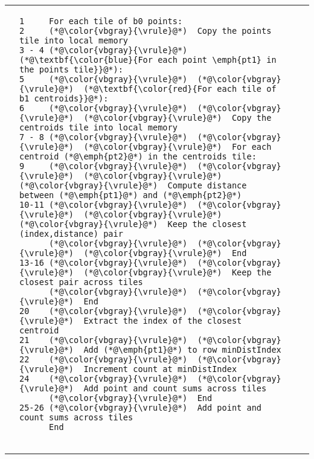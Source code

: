 \centering\begin{tabular}{cm{}m{}m{}}
{} &
{\begin{lstlisting}[numbers=none,language=Pseudo]
1     For each tile of b0 points:
2     (*@\color{vbgray}{\vrule}@*)  Copy the points tile into local memory
3 - 4 (*@\color{vbgray}{\vrule}@*)  (*@\textbf{\color{blue}{For each point \emph{pt1} in the points tile}}@*):
5     (*@\color{vbgray}{\vrule}@*)  (*@\color{vbgray}{\vrule}@*)  (*@\textbf{\color{red}{For each tile of b1 centroids}}@*):
6     (*@\color{vbgray}{\vrule}@*)  (*@\color{vbgray}{\vrule}@*)  (*@\color{vbgray}{\vrule}@*)  Copy the centroids tile into local memory
7 - 8 (*@\color{vbgray}{\vrule}@*)  (*@\color{vbgray}{\vrule}@*)  (*@\color{vbgray}{\vrule}@*)  For each centroid (*@\emph{pt2}@*) in the centroids tile:
9     (*@\color{vbgray}{\vrule}@*)  (*@\color{vbgray}{\vrule}@*)  (*@\color{vbgray}{\vrule}@*)  (*@\color{vbgray}{\vrule}@*)  Compute distance between (*@\emph{pt1}@*) and (*@\emph{pt2}@*)
10-11 (*@\color{vbgray}{\vrule}@*)  (*@\color{vbgray}{\vrule}@*)  (*@\color{vbgray}{\vrule}@*)  (*@\color{vbgray}{\vrule}@*)  Keep the closest (index,distance) pair
      (*@\color{vbgray}{\vrule}@*)  (*@\color{vbgray}{\vrule}@*)  (*@\color{vbgray}{\vrule}@*)  End
13-16 (*@\color{vbgray}{\vrule}@*)  (*@\color{vbgray}{\vrule}@*)  (*@\color{vbgray}{\vrule}@*)  Keep the closest pair across tiles
      (*@\color{vbgray}{\vrule}@*)  (*@\color{vbgray}{\vrule}@*)  End
20    (*@\color{vbgray}{\vrule}@*)  (*@\color{vbgray}{\vrule}@*)  Extract the index of the closest centroid
21    (*@\color{vbgray}{\vrule}@*)  (*@\color{vbgray}{\vrule}@*)  Add (*@\emph{pt1}@*) to row minDistIndex
22    (*@\color{vbgray}{\vrule}@*)  (*@\color{vbgray}{\vrule}@*)  Increment count at minDistIndex
24    (*@\color{vbgray}{\vrule}@*)  (*@\color{vbgray}{\vrule}@*)  Add point and count sums across tiles
      (*@\color{vbgray}{\vrule}@*)  End
25-26 (*@\color{vbgray}{\vrule}@*)  Add point and count sums across tiles
      End


\end{lstlisting}}
\end{tabular}
